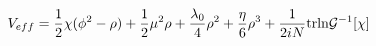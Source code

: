 \begin{equation}
V_{eff}=  \frac{1}{2} \chi( \phi^2 - \rho)  +\frac{1}{2} \mu^2 \rho + \frac
{\lambda_0}{ 4} \rho^2 +
\frac{\eta}{6} \rho^3 + \frac{1}{2iN} {\rm tr} {\ln} {\mathcal
G}^{-1}[\chi]
\end{equation}

